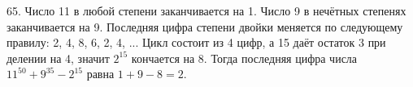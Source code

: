 65. Число 11 в любой степени заканчивается на 1. Число 9 в нечётных степенях заканчивается на 9. Последняя цифра степени двойки меняется по следующему правилу: 2, 4, 8, 6, 2, 4, ... Цикл состоит из 4 цифр, а 15 даёт остаток 3 при делении на 4, значит $2^{15}$ кончается на 8. Тогда последняя цифра числа $11^{50}+9^{35}-2^{15}$
равна $1+9-8=2.$\\

